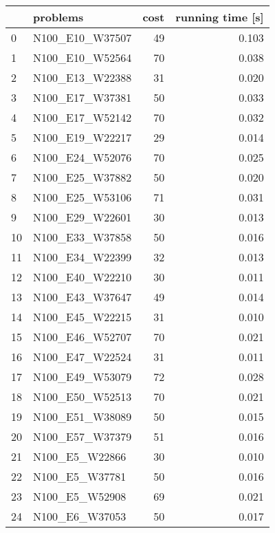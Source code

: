 \begin{table}
\centering
\begin{tabular}{llrr}
\toprule
{} &            problems &  cost &  running time [s] \\
\midrule
0  &     N100\_E10\_W37507 &    49 &             0.103 \\
1  &     N100\_E10\_W52564 &    70 &             0.038 \\
2  &     N100\_E13\_W22388 &    31 &             0.020 \\
3  &     N100\_E17\_W37381 &    50 &             0.033 \\
4  &     N100\_E17\_W52142 &    70 &             0.032 \\
5  &     N100\_E19\_W22217 &    29 &             0.014 \\
6  &     N100\_E24\_W52076 &    70 &             0.025 \\
7  &     N100\_E25\_W37882 &    50 &             0.020 \\
8  &     N100\_E25\_W53106 &    71 &             0.031 \\
9  &     N100\_E29\_W22601 &    30 &             0.013 \\
10 &     N100\_E33\_W37858 &    50 &             0.016 \\
11 &     N100\_E34\_W22399 &    32 &             0.013 \\
12 &     N100\_E40\_W22210 &    30 &             0.011 \\
13 &     N100\_E43\_W37647 &    49 &             0.014 \\
14 &     N100\_E45\_W22215 &    31 &             0.010 \\
15 &     N100\_E46\_W52707 &    70 &             0.021 \\
16 &     N100\_E47\_W22524 &    31 &             0.011 \\
17 &     N100\_E49\_W53079 &    72 &             0.028 \\
18 &     N100\_E50\_W52513 &    70 &             0.021 \\
19 &     N100\_E51\_W38089 &    50 &             0.015 \\
20 &     N100\_E57\_W37379 &    51 &             0.016 \\
21 &      N100\_E5\_W22866 &    30 &             0.010 \\
22 &      N100\_E5\_W37781 &    50 &             0.016 \\
23 &      N100\_E5\_W52908 &    69 &             0.021 \\
24 &      N100\_E6\_W37053 &    50 &             0.017 \\

\end{tabular}
\end{table}
